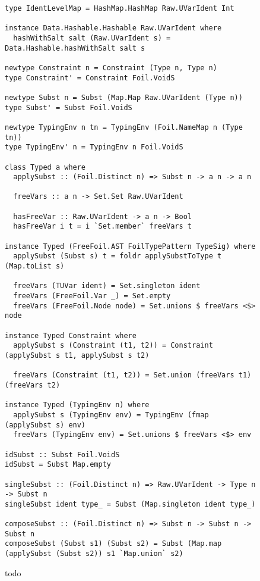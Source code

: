 \begin{figure}[H]
  \begin{verbatim}
type IdentLevelMap = HashMap.HashMap Raw.UVarIdent Int

instance Data.Hashable.Hashable Raw.UVarIdent where
  hashWithSalt salt (Raw.UVarIdent s) = Data.Hashable.hashWithSalt salt s

newtype Constraint n = Constraint (Type n, Type n)
type Constraint' = Constraint Foil.VoidS

newtype Subst n = Subst (Map.Map Raw.UVarIdent (Type n))
type Subst' = Subst Foil.VoidS

newtype TypingEnv n tn = TypingEnv (Foil.NameMap n (Type tn))
type TypingEnv' n = TypingEnv n Foil.VoidS

class Typed a where
  applySubst :: (Foil.Distinct n) => Subst n -> a n -> a n

  freeVars :: a n -> Set.Set Raw.UVarIdent

  hasFreeVar :: Raw.UVarIdent -> a n -> Bool
  hasFreeVar i t = i `Set.member` freeVars t

instance Typed (FreeFoil.AST FoilTypePattern TypeSig) where
  applySubst (Subst s) t = foldr applySubstToType t (Map.toList s)

  freeVars (TUVar ident) = Set.singleton ident
  freeVars (FreeFoil.Var _) = Set.empty
  freeVars (FreeFoil.Node node) = Set.unions $ freeVars <$> node

instance Typed Constraint where
  applySubst s (Constraint (t1, t2)) = Constraint (applySubst s t1, applySubst s t2)

  freeVars (Constraint (t1, t2)) = Set.union (freeVars t1) (freeVars t2)

instance Typed (TypingEnv n) where
  applySubst s (TypingEnv env) = TypingEnv (fmap (applySubst s) env)
  freeVars (TypingEnv env) = Set.unions $ freeVars <$> env

idSubst :: Subst Foil.VoidS
idSubst = Subst Map.empty

singleSubst :: (Foil.Distinct n) => Raw.UVarIdent -> Type n -> Subst n
singleSubst ident type_ = Subst (Map.singleton ident type_)

composeSubst :: (Foil.Distinct n) => Subst n -> Subst n -> Subst n
composeSubst (Subst s1) (Subst s2) = Subst (Map.map (applySubst (Subst s2)) s1 `Map.union` s2)
  \end{verbatim}
  \caption{todo}
\end{figure}

